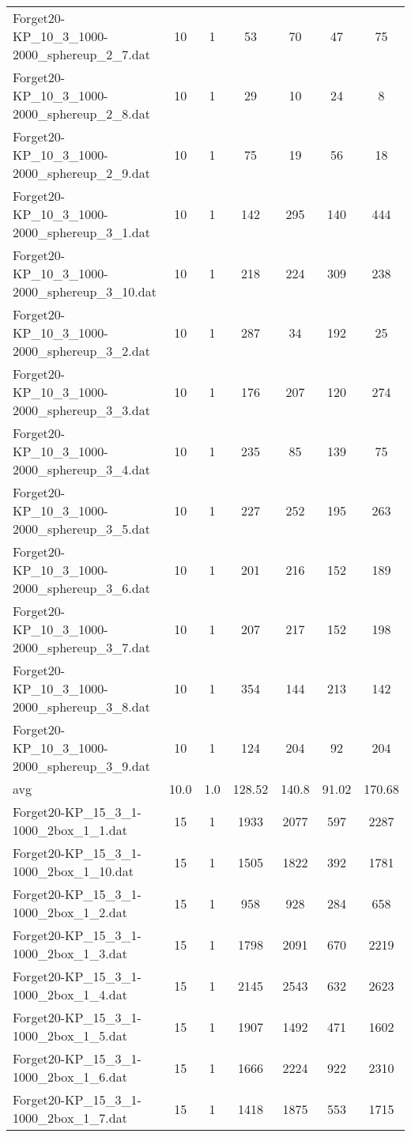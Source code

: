 \begin{table}[!ht]
\begin{tabular}{lcccccc}
Forget20-KP\_10\_3\_1000-2000\_sphereup\_2\_7.dat & 10 & 1 & 53 & 70 & 47 & 75 \\
Forget20-KP\_10\_3\_1000-2000\_sphereup\_2\_8.dat & 10 & 1 & 29 & 10 & 24 & 8 \\
Forget20-KP\_10\_3\_1000-2000\_sphereup\_2\_9.dat & 10 & 1 & 75 & 19 & 56 & 18 \\
Forget20-KP\_10\_3\_1000-2000\_sphereup\_3\_1.dat & 10 & 1 & 142 & 295 & 140 & 444 \\
Forget20-KP\_10\_3\_1000-2000\_sphereup\_3\_10.dat & 10 & 1 & 218 & 224 & 309 & 238 \\
Forget20-KP\_10\_3\_1000-2000\_sphereup\_3\_2.dat & 10 & 1 & 287 & 34 & 192 & 25 \\
Forget20-KP\_10\_3\_1000-2000\_sphereup\_3\_3.dat & 10 & 1 & 176 & 207 & 120 & 274 \\
Forget20-KP\_10\_3\_1000-2000\_sphereup\_3\_4.dat & 10 & 1 & 235 & 85 & 139 & 75 \\
Forget20-KP\_10\_3\_1000-2000\_sphereup\_3\_5.dat & 10 & 1 & 227 & 252 & 195 & 263 \\
Forget20-KP\_10\_3\_1000-2000\_sphereup\_3\_6.dat & 10 & 1 & 201 & 216 & 152 & 189 \\
Forget20-KP\_10\_3\_1000-2000\_sphereup\_3\_7.dat & 10 & 1 & 207 & 217 & 152 & 198 \\
Forget20-KP\_10\_3\_1000-2000\_sphereup\_3\_8.dat & 10 & 1 & 354 & 144 & 213 & 142 \\
Forget20-KP\_10\_3\_1000-2000\_sphereup\_3\_9.dat & 10 & 1 & 124 & 204 & 92 & 204 \\
\cline{1-9} avg & 10.0 & 1.0 & 128.52& 140.8 & 91.02& 170.68\\ \hline
Forget20-KP\_15\_3\_1-1000\_2box\_1\_1.dat & 15 & 1 & 1933 & 2077 & 597 & 2287 \\
Forget20-KP\_15\_3\_1-1000\_2box\_1\_10.dat & 15 & 1 & 1505 & 1822 & 392 & 1781 \\
Forget20-KP\_15\_3\_1-1000\_2box\_1\_2.dat & 15 & 1 & 958 & 928 & 284 & 658 \\
Forget20-KP\_15\_3\_1-1000\_2box\_1\_3.dat & 15 & 1 & 1798 & 2091 & 670 & 2219 \\
Forget20-KP\_15\_3\_1-1000\_2box\_1\_4.dat & 15 & 1 & 2145 & 2543 & 632 & 2623 \\
Forget20-KP\_15\_3\_1-1000\_2box\_1\_5.dat & 15 & 1 & 1907 & 1492 & 471 & 1602 \\
Forget20-KP\_15\_3\_1-1000\_2box\_1\_6.dat & 15 & 1 & 1666 & 2224 & 922 & 2310 \\
Forget20-KP\_15\_3\_1-1000\_2box\_1\_7.dat & 15 & 1 & 1418 & 1875 & 553 & 1715 \\

\end{tabular}
\end{table}

